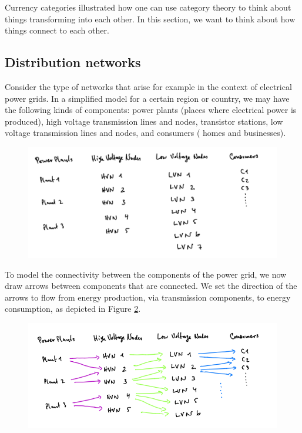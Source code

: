 
Currency categories illustrated how one can use category theory to think about things transforming into each other. In this section, we want to think about how things connect to each other.

\subsection{Distribution networks}

Consider the type of networks that arise for example in the context of electrical power grids. In a simplified model for a certain region or country, we may have the following kinds of components: power plants (places where electrical power is produced), high voltage transmission lines and nodes, transistor stations, low voltage transmission lines and nodes, and consumers ( homes and businesses). 
\begin{figure}[h!]
\centering
 \includegraphics[width=0.7\linewidth]{pics/dist_net_1.png}
 \caption{}
\label{fig:power_nodes}
\end{figure}
To model the connectivity between the components of the power grid, we now draw arrows between components that are connected. We set the direction of the arrows to flow from energy production, via transmission components, to energy consumption, as depicted in Figure \ref{fig:power_nodes_connected}. 
\begin{figure}[h!]
\centering
 \includegraphics[width=0.7\linewidth]{pics/dist_net_2.png}
 \caption{}
\label{fig:power_nodes_connected}
\end{figure}


